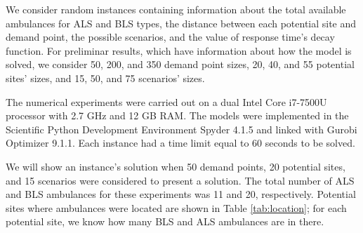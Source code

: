 We consider random instances containing information about the total available ambulances for ALS and BLS types, the distance between each potential site and demand point, the possible scenarios, and the value of response time's decay function. For preliminar results, which have information about how the model is solved, we consider 50, 200, and 350 demand point sizes, 20, 40, and 55 potential sites' sizes, and 15, 50, and 75 scenarios' sizes. 

The numerical experiments were carried out on a dual Intel Core i7-7500U processor with 2.7 GHz and 12 GB RAM. The models were implemented in the Scientific Python Development Environment Spyder 4.1.5 and linked with Gurobi Optimizer 9.1.1. Each instance had a time limit equal to 60 seconds to be solved. 

We will show an instance's solution when 50 demand points, 20 potential sites, and 15 scenarios were considered to present a solution. The total number of ALS and BLS ambulances for these experiments was 11 and 20, respectively. Potential sites where ambulances were located are shown in Table \ref{tab:location}; for each potential site, we know how many BLS and ALS ambulances are in there. 


